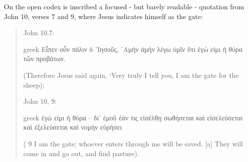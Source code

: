 \documentclass[amsthm,ebook]{saparticle}
\begin{document}
On the open codex is inscribed a focused - but barely readable - quotation from John 10, verses 7 and 9, where Jesus
indicates himself as the gate: 




\begin{quotation}
John 10.7: \begin{otherlanguage*}{greek}
Εἶπεν οὖν πάλιν ὁ ᾿Ιησοῦς, ᾿Αμὴν ἀμὴν λέγω ὑμῖν ὅτι ἐγώ εἰμι ἡ θύρα τῶν προβάτων.
\end{otherlanguage*} (Therefore Jesus said again, ‘Very truly I tell you, I am the gate for the sheep); 

John 10, 9: \begin{otherlanguage*}{greek}
ἐγώ εἰμι ἡ θύρα· δι' ἐμοῦ ἐάν τις εἰσέλθῃ σωθήσεται καὶ εἰσελεύσεται καὶ ἐξελεύσεται καὶ νομὴν εὑρήσει
\end{otherlanguage*}  ( 9 I am the gate;
whoever enters through me will be saved. [a] They will come in and go out, and find pasture).

\end{quotation}
\end{document}
